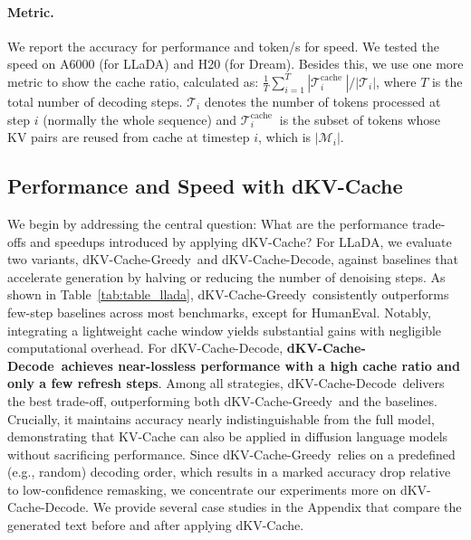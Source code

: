 \documentclass{article}
\newcommand{\methodname}{dKV-Cache}
\newcommand{\dmethodname}{dKV-Cache-Decode}
\newcommand{\mmethodname}{dKV-Cache-Greedy}
\newcounter{mycounter} %
\newcommand{\findingbox}[1]{
    \stepcounter{mycounter} %
    \begin{tcolorbox}[colframe=black,
                      arc=1pt,
                      boxsep=-2pt,
                      ]
        \noindent{\textbf{\textit{Finding \themycounter.}}} #1
    \end{tcolorbox}
}
\begin{document}
\paragraph{Metric.} We report the accuracy for performance and token/s for speed. We tested the speed on A6000 (for LLaDA) and H20 (for Dream). Besides this, we use one more metric to show the cache ratio, calculated as: $\frac{1}{T} \sum_{i=1}^T {\left|\mathcal{T}_i^{\text {cache }}\right|}/{\left|\mathcal{T}_i\right|}$, where $T$ is the total number of decoding steps. $\mathcal{T}_i$ denotes the number of tokens processed at step $i$ (normally the whole sequence) and $\mathcal{T}_i^{\text {cache }}$
is the subset of tokens whose KV pairs are reused from cache at timestep $i$, which is $|\mathcal{M}_i|$.

\subsection{Performance and Speed with \methodname}
We begin by addressing the central question: What are the performance trade-offs and speedups introduced by applying \methodname? For LLaDA, we evaluate two variants, \mmethodname\ and \dmethodname, against baselines that accelerate generation by halving or reducing the number of denoising steps. As shown in Table~\ref{tab:table_llada}, \mmethodname\ consistently outperforms few-step baselines across most benchmarks, except for HumanEval. Notably, integrating a lightweight cache window yields substantial gains with negligible computational overhead. For \dmethodname, \textbf{\dmethodname\ achieves near-lossless performance with a high cache ratio and only a few refresh steps}. Among all strategies, \dmethodname\ delivers the best trade-off, outperforming both \mmethodname\ and the baselines. Crucially, it maintains accuracy nearly indistinguishable from the full model, demonstrating that KV-Cache can also be applied in diffusion language models without sacrificing performance. Since \mmethodname\ relies on a predefined (e.g., random) decoding order, which results in a marked accuracy drop relative to low-confidence remasking, we concentrate our experiments more on \dmethodname. We provide several case studies in the Appendix that compare the generated text before and after applying \methodname.
\end{document}
